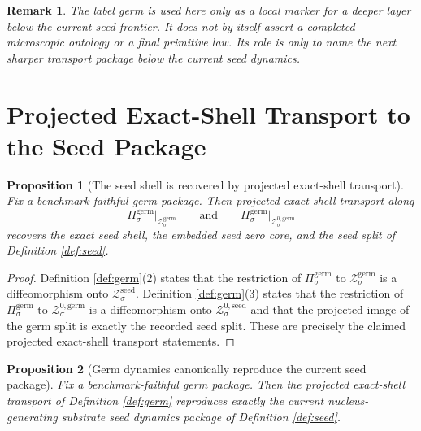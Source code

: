 \documentclass[11pt]{article}
\newcommand{\SeedShellSet}[1]{\mathcal Z_{#1}^{\mathrm{seed}}}
\newcommand{\SeedZeroCore}[1]{\mathcal Z_{#1}^{0,\mathrm{seed}}}
\newcommand{\GermProj}[1]{\Pi_{#1}^{\mathrm{germ}}}
\newcommand{\GermShellSet}[1]{\mathcal Z_{#1}^{\mathrm{germ}}}
\newcommand{\GermZeroCore}[1]{\mathcal Z_{#1}^{0,\mathrm{germ}}}
\newtheorem{proposition}{Proposition}
\newtheorem{remark}{Remark}
\begin{document}
\begin{remark}
The label \emph{germ} is used here only as a local marker for a deeper layer below the current seed frontier. It does not by itself assert a completed microscopic ontology or a final primitive law. Its role is only to name the next sharper transport package below the current seed dynamics.
\end{remark}

\section{Projected Exact-Shell Transport to the Seed Package}

\begin{proposition}[The seed shell is recovered by projected exact-shell transport]
\label{prop:shell}
Fix a benchmark-faithful germ package. Then projected exact-shell transport along
\[
\GermProj{\sigma}\big|_{\GermShellSet{\sigma}}
\qquad\text{and}\qquad
\GermProj{\sigma}\big|_{\GermZeroCore{\sigma}}
\]
recovers the exact seed shell, the embedded seed zero core, and the seed split of Definition \ref{def:seed}.
\end{proposition}

\begin{proof}
Definition \ref{def:germ}(2) states that the restriction of \(\GermProj{\sigma}\) to \(\GermShellSet{\sigma}\) is a diffeomorphism onto \(\SeedShellSet{\sigma}\). Definition \ref{def:germ}(3) states that the restriction of \(\GermProj{\sigma}\) to \(\GermZeroCore{\sigma}\) is a diffeomorphism onto \(\SeedZeroCore{\sigma}\) and that the projected image of the germ split is exactly the recorded seed split. These are precisely the claimed projected exact-shell transport statements.
\end{proof}

\begin{proposition}[Germ dynamics canonically reproduce the current seed package]
\label{prop:seed}
Fix a benchmark-faithful germ package. Then the projected exact-shell transport of Definition \ref{def:germ} reproduces exactly the current nucleus-generating substrate seed dynamics package of Definition \ref{def:seed}.
\end{proposition}
\end{document}
